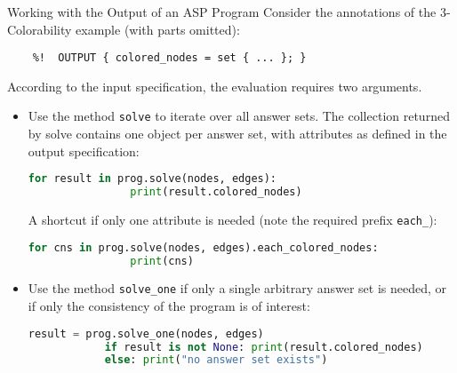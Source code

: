 \documentclass[%
beamer,%
english,%
10pt,%
]{beamer}
\newcommand{\blue}[1]{{\color{blue}#1}}
\begin{document}
\begin{frame}[fragile]{Working with the Output of an ASP Program}
    Consider the annotations of the 3-Colorability example (with parts omitted):
    \begin{lstlisting}[basicstyle=\footnotesize,autogobble]
    %!  INPUT (Set<Node> nodes, Set<Edge> edges) { ... }
    %!  OUTPUT { colored_nodes = set { ... }; }
    \end{lstlisting}

    According to the input specification, the evaluation requires two arguments.

    \begin{itemize}
        \item
            Use the method \blue{\lstinline{solve}} to iterate over all answer sets.
            The collection returned by \blue{solve} contains one object per answer set,
            with attributes as defined in the output specification:
            \begin{lstlisting}[basicstyle=\footnotesize,autogobble,language=python]
            for result in prog.solve(nodes, edges):
                print(result.colored_nodes)
            \end{lstlisting}
            A shortcut if only one attribute is needed (note the required prefix \blue{\lstinline{each_}}):
            \begin{lstlisting}[basicstyle=\footnotesize,autogobble,language=python]
            for cns in prog.solve(nodes, edges).each_colored_nodes:
                print(cns)
            \end{lstlisting}
        \item
            Use the method \blue{\lstinline{solve_one}} if only a single arbitrary answer set is needed,
            or if only the consistency of the program is of interest:
            \begin{lstlisting}[basicstyle=\footnotesize,autogobble,language=python]
            result = prog.solve_one(nodes, edges)
            if result is not None: print(result.colored_nodes)
            else: print("no answer set exists")
            \end{lstlisting}
    \end{itemize}
\end{frame}
\end{document}
